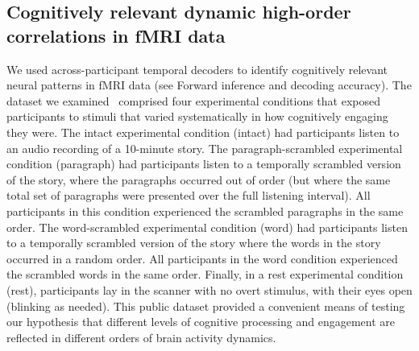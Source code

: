 \documentclass[english]{article}
\begin{document}
\subsection*{Cognitively relevant dynamic high-order correlations in
  fMRI data}
We used across-participant temporal decoders to identify cognitively
relevant neural patterns in fMRI data (see Forward inference
  and decoding accuracy).  The dataset we examined~\citep[collected
by][]{SimoEtal16} comprised four experimental conditions that exposed
participants to stimuli that varied systematically in how cognitively
engaging they were.  The intact experimental condition (intact) had
participants listen to an audio recording of a 10-minute story.  The
paragraph-scrambled experimental condition (paragraph) had participants
listen to a temporally scrambled version of the story, where the
paragraphs occurred out of order (but where the same total set of
paragraphs were presented over the full listening interval).  All
participants in this condition experienced the scrambled paragraphs in
the same order.  The word-scrambled experimental condition (word)
had participants listen to a temporally scrambled version of the story
where the words in the story occurred in a random order.  All
participants in the word condition experienced the scrambled words in
the same order.  Finally, in a rest experimental condition (rest),
participants lay in the scanner with no overt stimulus, with their
eyes open (blinking as needed).  This public dataset provided a convenient
means of testing our hypothesis that different levels of cognitive
processing and engagement are reflected in different orders of brain
activity dynamics.
\end{document}
